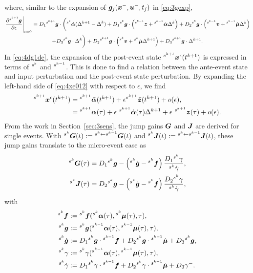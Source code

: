 \documentclass[../DC2017114Bouma.tex]{subfiles}
\begin{document}
where, similar to the expansion of ${\boldsymbol{g}}_j({\boldsymbol{x}}^-,{\boldsymbol{u}}^-,t_j)$ in \eqref{eq:3gexp},
\begin{multline}
\left.\frac{\partial\hspace{0cm}^{s^{k+1}}{\boldsymbol{g}}}{\partial\epsilon}\right|_{\epsilon=0} = D_1\hspace{0cm}^{s^{k+1}}{\boldsymbol{g}}\cdot\bigg(\hspace{0cm}^{s^k}\dot{\boldsymbol{\alpha}}(\Delta^{k+1}-\Delta^{k}) + D_1\hspace{0cm}^{s^k}{\boldsymbol{g}}\cdot\left(\hspace{0cm}^{s^{k-1}}{\boldsymbol{z}}+\hspace{0cm}^{s^{k-1}}\dot{\boldsymbol{\alpha}}\Delta^{k}\right) + D_2\hspace{0cm}^{s^k}{\boldsymbol{g}}\cdot\left(\hspace{0cm}^{s^{k-1}}{\boldsymbol{v}}+\hspace{0cm}^{s^{k-1}}\dot{\boldsymbol{\mu}}\Delta^{k}\right) \\ + D_3\hspace{0cm}^{s^k}{\boldsymbol{g}}\cdot\Delta^{k} \bigg)+ D_2 \hspace{0cm}^{s^{k+1}}{\boldsymbol{g}}\cdot\left(\hspace{0cm}^{s^{k}}{\boldsymbol{v}}+\hspace{0cm}^{s^{k}}\dot{\boldsymbol{\mu}}\Delta^{k+1} \right) + D_3\hspace{0cm}^{s^{k+1}}{\boldsymbol{g}}\cdot\Delta^{k+1}. \label{eq:4dg1de}
\end{multline}
In \eqref{eq:4dg1de}, the expansion of the post-event state $\hspace{0cm}^{s^{k+1}}{\boldsymbol{x}}^\epsilon(t^{k+1})$ is expressed in terms of $\hspace{0cm}^{s^{k}}$ and $\hspace{0cm}^{s^{k-1}}$. This is done to find a relation between the ante-event state and input perturbation and the post-event state perturbation. By expanding the left-hand side of \eqref{eq:4xe012} with respect to $\epsilon$, we find
\begin{align}
\ls^{s^{k+1}}\xb^\epsilon(t^{k+1}) &= \ls^{s^{k+1}}\bar{\alphab}(t^{k+1})+\epsilon\ls^{s^{k+1}}\bar{\zb}(t^{k+1}) + o(\epsilon),\\
&= \ls^{s^{k+1}}\alphab(\tau) + \epsilon\ ^{s^{k+1}}\dot{\alphab}(\tau)\Delta^{k+1} + \epsilon\ ^{s^{k+1}}\zb(\tau) + o(\epsilon).\label{eq:4xexp}
\end{align}
From the work in Section~\ref{sec:3sens}, the jump gains ${\boldsymbol{G}}$ and ${\boldsymbol{J}}$ are derived for single events. With $\hspace{0cm}^{s^k}{\boldsymbol{G}}(t) := \hspace{0cm}^{s^{k}\leftarrow s^{k-1}}{\boldsymbol{G}}(t)$ and $\hspace{0cm}^{s^k}{\boldsymbol{J}}(t) := \hspace{0cm}^{s^{k}\leftarrow s^{k-1}}{\boldsymbol{J}}(t)$, these jump gains translate to the micro-event case as
\begin{align}
\hspace{0cm}^{s^k}{\boldsymbol{G}}(\tau) &= D_1\hspace{0cm}^{s^k}{\boldsymbol{g}} - \left(\hspace{0cm}^{s^k}\dot{{\boldsymbol{g}}} - \hspace{0cm}^{s^{k}}{\boldsymbol{f}}\right)\frac{D_1\hspace{0cm}^{s^k}\gamma}{\hspace{0cm}^{s^k}\dot{\gamma}},\\
\hspace{0cm}^{s^k}{\boldsymbol{J}}(\tau) &= D_2\hspace{0cm}^{s^k}{\boldsymbol{g}} - \left(\hspace{0cm}^{s^k}\dot{{\boldsymbol{g}}} - \hspace{0cm}^{s^{k}}{\boldsymbol{f}}\right)\frac{D_2\hspace{0cm}^{s^k}\gamma}{\hspace{0cm}^{s^k}\dot{\gamma}},
\end{align}
with
\begin{align*}
\hspace{0cm}^{s^k}{\boldsymbol{f}} &:= \hspace{0cm}^{s^k}{\boldsymbol{f}}(\hspace{0cm}^{s^{k}}\boldsymbol{\alpha}(\tau),\hspace{0cm}^{s^{k}}\boldsymbol{\mu}(\tau),\tau),\\
\hspace{0cm}^{s^k}{\boldsymbol{g}} &:= \hspace{0cm}^{s^k}{\boldsymbol{g}}(\hspace{0cm}^{s^{k-1}}\boldsymbol{\alpha}(\tau),\hspace{0cm}^{s^{k-1}}\boldsymbol{\mu}(\tau),\tau),\\
\hspace{0cm}^{s^k}\dot{{\boldsymbol{g}}} &:= D_1\hspace{0cm}^{s^k}{\boldsymbol{g}}\cdot \hspace{0cm}^{s^{k-1}}{\boldsymbol{f}} + D_2\hspace{0cm}^{s^k}{\boldsymbol{g}}\cdot \hspace{0cm}^{s^{k-1}}\dot{\boldsymbol{\mu}} + D_3\hspace{0cm}^{s^k}{\boldsymbol{g}},\\
\hspace{0cm}^{s^k}\gamma &:= \hspace{0cm}^{s^k}\gamma(\hspace{0cm}^{s^{k-1}}\boldsymbol{\alpha}(\tau),\hspace{0cm}^{s^{k-1}}\boldsymbol{\mu}(\tau),\tau),\\
\hspace{0cm}^{s^k}\dot{\gamma} &:= D_1\hspace{0cm}^{s^{k}}\gamma\cdot\hspace{0cm}^{s^{k-1}}{\boldsymbol{f}} + D_2\hspace{0cm}^{s^{k}}\gamma\cdot\hspace{0cm}^{s^{k-1}}\dot{\boldsymbol{\mu}} + D_3\gamma^-.
\end{align*}
\end{document}
